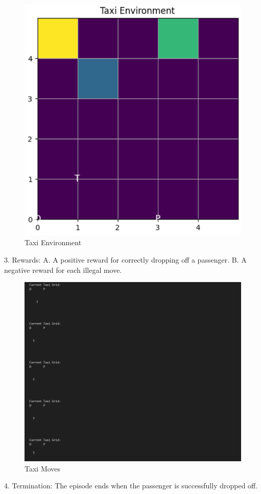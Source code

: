 \begin{figure}[H]  %
    \centering
    \includegraphics[width=1\linewidth]{figures/Taxi_Environment.PNG}
    \caption{Taxi Environment}
    \label{fig:Taxi Environment}
\end{figure}
3. Rewards: 
A. A positive reward for correctly dropping off a passenger.
B. A negative reward for each illegal move.
\newline
\begin{figure}[H]  %
    \centering
    \includegraphics[width=1\linewidth]{figures/Taxi_moves.PNG}
    \caption{Taxi Moves}
    \label{fig:Taxi Moves}
\end{figure}
4. Termination: The episode ends when the passenger is successfully dropped off.

